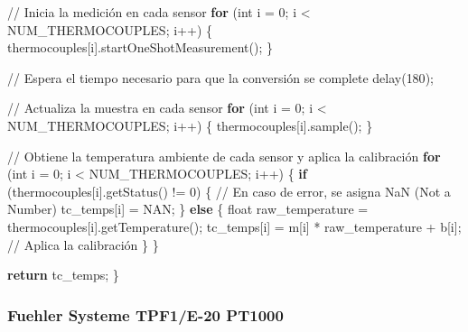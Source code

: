 \documentclass[
  letterpaper,
]{scrbook}
\newenvironment{Shaded}{\begin{snugshade}}{\end{snugshade}}
\newcommand{\BuiltInTok}[1]{\textcolor[rgb]{0.00,0.23,0.31}{#1}}
\newcommand{\ControlFlowTok}[1]{\textcolor[rgb]{0.00,0.23,0.31}{\textbf{#1}}}
\newcommand{\DecValTok}[1]{\textcolor[rgb]{0.68,0.00,0.00}{#1}}
\newcommand{\NormalTok}[1]{\textcolor[rgb]{0.00,0.23,0.31}{#1}}
\newcommand{\OperatorTok}[1]{\textcolor[rgb]{0.37,0.37,0.37}{#1}}
\begin{document}
\begin{Shaded}
\begin{Highlighting}[]
  \OperatorTok{//}\NormalTok{ Inicia la medición en cada sensor}
  \ControlFlowTok{for}\NormalTok{ (}\BuiltInTok{int}\NormalTok{ i }\OperatorTok{=} \DecValTok{0}\OperatorTok{;}\NormalTok{ i }\OperatorTok{\textless{}}\NormalTok{ NUM\_THERMOCOUPLES}\OperatorTok{;}\NormalTok{ i}\OperatorTok{++}\NormalTok{) \{}
\NormalTok{    thermocouples[i].startOneShotMeasurement()}\OperatorTok{;}
\NormalTok{  \}}
  
  \OperatorTok{//}\NormalTok{ Espera el tiempo necesario para que la conversión se complete}
\NormalTok{  delay(}\DecValTok{180}\NormalTok{)}\OperatorTok{;}
  
  \OperatorTok{//}\NormalTok{ Actualiza la muestra en cada sensor}
  \ControlFlowTok{for}\NormalTok{ (}\BuiltInTok{int}\NormalTok{ i }\OperatorTok{=} \DecValTok{0}\OperatorTok{;}\NormalTok{ i }\OperatorTok{\textless{}}\NormalTok{ NUM\_THERMOCOUPLES}\OperatorTok{;}\NormalTok{ i}\OperatorTok{++}\NormalTok{) \{}
\NormalTok{    thermocouples[i].sample()}\OperatorTok{;}
\NormalTok{  \}}
  
  \OperatorTok{//}\NormalTok{ Obtiene la temperatura ambiente de cada sensor y aplica la calibración}
  \ControlFlowTok{for}\NormalTok{ (}\BuiltInTok{int}\NormalTok{ i }\OperatorTok{=} \DecValTok{0}\OperatorTok{;}\NormalTok{ i }\OperatorTok{\textless{}}\NormalTok{ NUM\_THERMOCOUPLES}\OperatorTok{;}\NormalTok{ i}\OperatorTok{++}\NormalTok{) \{}
    \ControlFlowTok{if}\NormalTok{ (thermocouples[i].getStatus() }\OperatorTok{!=} \DecValTok{0}\NormalTok{) \{}
      \OperatorTok{//}\NormalTok{ En caso de error, se asigna NaN (Not a Number)}
\NormalTok{      tc\_temps[i] }\OperatorTok{=}\NormalTok{ NAN}\OperatorTok{;}
\NormalTok{    \} }\ControlFlowTok{else}\NormalTok{ \{}
      \BuiltInTok{float}\NormalTok{ raw\_temperature }\OperatorTok{=}\NormalTok{ thermocouples[i].getTemperature()}\OperatorTok{;}
\NormalTok{      tc\_temps[i] }\OperatorTok{=}\NormalTok{ m[i] }\OperatorTok{*}\NormalTok{ raw\_temperature }\OperatorTok{+}\NormalTok{ b[i]}\OperatorTok{;}  \OperatorTok{//}\NormalTok{ Aplica la calibración}
\NormalTok{    \}}
\NormalTok{  \}}
  
  \ControlFlowTok{return}\NormalTok{ tc\_temps}\OperatorTok{;}
\NormalTok{\}}
\end{Highlighting}
\end{Shaded}

\subsubsection{Fuehler Systeme TPF1/E-20
PT1000}\label{fuehler-systeme-tpf1e-20-pt1000}
\end{document}
